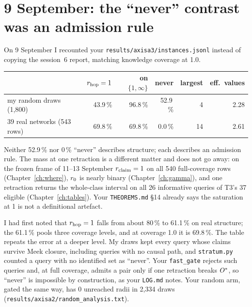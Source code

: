 \begin{antes}
\end{antes}

\section{9 September: the ``never'' contrast was an admission rule}
\label{sec:redef-harness}

On 9 September I recounted your \texttt{results/axisa3/instances.jsonl} instead of copying the session~6 report, matching
knowledge coverage at 1.0.

\begin{medido}
\begin{tabular}{@{}lrrrrr@{}}
 & $r_{\mathrm{hop}} = 1$ & on $\{1,\infty\}$ & never & largest & eff.\ values \\ \midrule
my random draws (1,800) & 43.9\,\% & 96.8\,\% & 52.9\,\% & 4 & 2.28 \\
39 real networks (543 rows) & 69.8\,\% & 69.8\,\% & 0.0\,\% & 14 & 2.61 \\
\end{tabular}
\end{medido}

Neither 52.9\,\% nor 0\,\% ``never'' describes structure; each describes an admission rule. The mass at one retraction
is a different matter and does not go away: on the frozen frame of 11--13 September $r_{\mathrm{claim}} = 1$ on all 540
full-coverage rows (Chapter~\ref{ch:where}), $r_{0}$ is nearly binary (Chapter~\ref{ch:gamma}), and one retraction
returns the whole-class interval on all 26 informative queries of T3's 37 eligible (Chapter~\ref{ch:tables}). Your \texttt{THEOREMS.md} §14 already
says the saturation at 1 is not a definitional artefact.

\begin{armadilha}
I had first noted that $r_{\mathrm{hop}} = 1$ falls from about 80\,\% to 61.1\,\% on real structure; the 61.1\,\% pools three
coverage levels, and at coverage 1.0 it is 69.8\,\%. The table repeats the error at a deeper level. My draws kept every
query whose claims survive Meek closure, including queries with no causal path, and \texttt{stratum.py} counted a query
with no identified set as ``never''. Your \texttt{fast\_gate} rejects such queries and, at full coverage, admits a pair
only if one retraction breaks $O^{*}$, so ``never'' is impossible by construction, as your \texttt{LOG.md} notes. Your
random arm, gated the same way, has 0 unreached radii in 2,334 draws (\texttt{results/axisa2/random\_analysis.txt}).
\end{armadilha}

